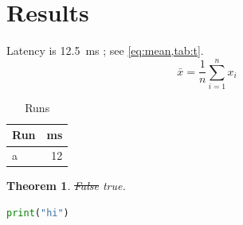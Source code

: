 \documentclass{article}
\newtheorem{theorem}{Theorem}
\begin{document}
\section{Results}\label{sec:results}
Latency is \SI{12.5}{\milli\second} \cite{knuth}; see \cref{eq:mean,tab:t}.
\begin{equation}\label{eq:mean}
  \bar{x} = \frac{1}{n}\sum_{i=1}^{n} x_i
\end{equation}
\begin{table}[H]\centering
  \begin{tabular}{lr}\toprule Run & ms \\ \midrule a & 12 \\ \bottomrule\end{tabular}
  \caption{Runs}\label{tab:t}
\end{table}
\begin{theorem}\sout{False} true.\end{theorem}
\begin{lstlisting}[language=Python]
print("hi")
\end{lstlisting}
\printbibliography
\end{document}
